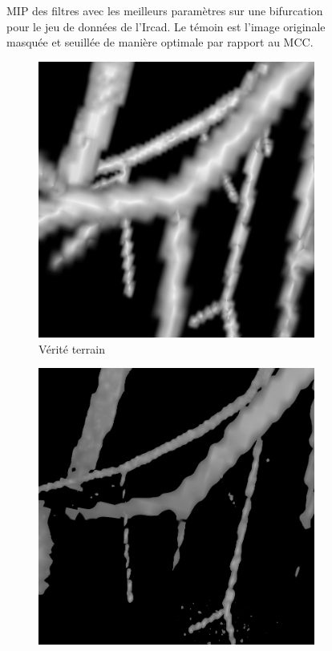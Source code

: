\begin{figure}[!ht]
      \caption{MIP des filtres avec les meilleurs paramètres sur une bifurcation pour le jeu de données de l'Ircad. Le témoin est l'image originale masquée et seuillée de manière optimale par rapport au MCC.
      }
      \label{fig:bifurcation_Ircad}
  \end{figure}
  \begin{figure}[!ht]
    \captionsetup[subfigure]{justification=centering}
    \centering
    \begin{subfigure}[t]{0.30\textwidth}
      \includegraphics[clip = true, trim  =  170 230 150 240, width=\textwidth]{Images/Vascu_2_k_GT.png}
      \caption{Vérité terrain}
    \end{subfigure}
    \begin{subfigure}[t]{0.30\textwidth}
      \includegraphics[clip = true, trim  =  170 230 150 240, width=\textwidth]{Images/Vascu_2_k_Baseline.png}

\end{subfigure}
\end{figure}
